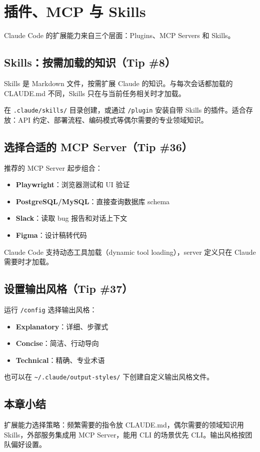 \section{插件、MCP 与 Skills}

Claude Code 的扩展能力来自三个层面：Plugins、MCP Servers 和 Skills。

\subsection{Skills：按需加载的知识（Tip \#8）}

Skills 是 Markdown 文件，按需扩展 Claude 的知识。与每次会话都加载的 CLAUDE.md 不同，Skills 只在与当前任务相关时才加载。

在 \texttt{.claude/skills/} 目录创建，或通过 \texttt{/plugin} 安装自带 Skills 的插件。适合存放：API 约定、部署流程、编码模式等偶尔需要的专业领域知识。

\subsection{选择合适的 MCP Server（Tip \#36）}

推荐的 MCP Server 起步组合：
\begin{itemize}
  \item \textbf{Playwright}：浏览器测试和 UI 验证
  \item \textbf{PostgreSQL/MySQL}：直接查询数据库 schema
  \item \textbf{Slack}：读取 bug 报告和对话上下文
  \item \textbf{Figma}：设计稿转代码
\end{itemize}

Claude Code 支持动态工具加载（dynamic tool loading），server 定义只在 Claude 需要时才加载。

\subsection{设置输出风格（Tip \#37）}

运行 \texttt{/config} 选择输出风格：
\begin{itemize}
  \item \textbf{Explanatory}：详细、步骤式
  \item \textbf{Concise}：简洁、行动导向
  \item \textbf{Technical}：精确、专业术语
\end{itemize}

也可以在 \texttt{\textasciitilde/.claude/output-styles/} 下创建自定义输出风格文件。

\subsection{本章小结}

扩展能力选择策略：频繁需要的指令放 CLAUDE.md，偶尔需要的领域知识用 Skills，外部服务集成用 MCP Server，能用 CLI 的场景优先 CLI。输出风格按团队偏好设置。

